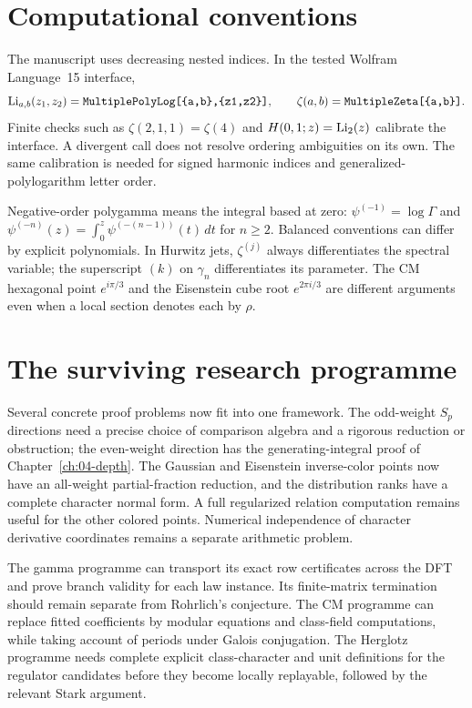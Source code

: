 \section{Computational conventions}
The manuscript uses decreasing nested indices. In the tested Wolfram
Language~15 interface,
\[
\operatorname{Li}_{a,b}(z_1,z_2)=
\texttt{MultiplePolyLog[\{a,b\},\{z1,z2\}]},\qquad
\zeta(a,b)=\texttt{MultipleZeta[\{a,b\}]}.
\]
Finite checks such as $\zeta(2,1,1)=\zeta(4)$ and
$H(0,1;z)=\operatorname{Li}_2(z)$ calibrate the interface. A divergent call does not
resolve ordering ambiguities on its own. The same calibration is needed
for signed harmonic indices and generalized-polylogarithm letter order.

Negative-order polygamma means the integral based at zero:
$\psi^{(-1)}=\log\Gamma$ and
$\psi^{(-n)}(z)=\int_0^z\psi^{(-(n-1))}(t)\,dt$ for $n\ge2$.
Balanced conventions can differ by explicit polynomials. In Hurwitz jets,
$\zeta^{(j)}$ always differentiates the spectral variable; the superscript
$(k)$ on $\gamma_n$ differentiates its parameter.
The CM hexagonal point $e^{i\pi/3}$ and the Eisenstein cube root
$e^{2\pi i/3}$ are different arguments even when a local section denotes
each by $\rho$.

\section{The surviving research programme}
Several concrete proof problems now fit into one framework. The odd-weight
$S_p$ directions need a precise choice of comparison algebra and a
rigorous reduction or obstruction; the even-weight direction has the
generating-integral proof of Chapter~\ref{ch:04-depth}. The Gaussian and
Eisenstein inverse-color points now have an all-weight partial-fraction
reduction, and the distribution ranks have a complete character normal
form. A full regularized relation computation remains useful for the other
colored points. Numerical independence of character derivative coordinates
remains a separate arithmetic problem.

The gamma programme can transport its exact row certificates across the
DFT and prove branch validity for each law instance. Its finite-matrix
termination should remain separate from Rohrlich's conjecture. The CM
programme can replace fitted coefficients by modular equations and
class-field computations, while taking account of periods under Galois
conjugation. The Herglotz programme needs complete explicit class-character
and unit definitions for the regulator candidates before they become
locally replayable, followed by the relevant Stark argument.

